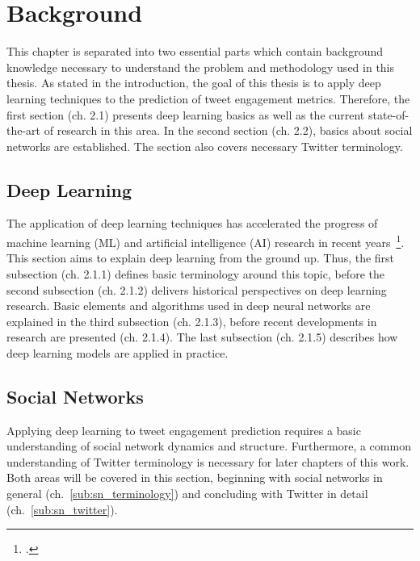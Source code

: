 \section{Background}
\label{ch:background}

This chapter is separated into two essential parts which contain background
knowledge necessary to understand the problem and methodology used in this 
thesis. As stated in the introduction, the goal of this thesis is to apply deep
learning techniques to the prediction of tweet engagement metrics. Therefore,
the first section (ch. 2.1) presents deep learning basics as well as the current
state-of-the-art of research in this area. In the second section (ch. 2.2), 
basics about social networks are established. The section also covers necessary 
Twitter terminology.

\subsection{Deep Learning}
\label{sec:deep_learning}

The application of deep learning techniques has accelerated the progress of 
machine learning (ML) and artificial intelligence (AI) research in recent years~\footcite{Brynjolfsson2017}. 
This section aims to explain deep learning from the ground up. Thus, the 
first subsection (ch. 2.1.1) defines basic terminology around this topic,
before the second subsection (ch. 2.1.2) delivers historical perspectives on deep learning research. 
Basic elements and algorithms used in deep neural networks are explained in the third 
subsection (ch. 2.1.3), before recent developments in research are
presented (ch. 2.1.4). The last subsection (ch. 2.1.5) describes how
deep learning models are applied in practice.











\subsection{Social Networks}
\label{sec:social_networks}

Applying deep learning to tweet engagement prediction requires a basic
understanding of social network dynamics and structure. Furthermore, a common
understanding of Twitter terminology is necessary for later chapters of this
work. Both areas will be covered in this section, beginning with social
networks in general (ch.~\ref{sub:sn_terminology}) and concluding with
Twitter in detail (ch.~\ref{sub:sn_twitter}).




